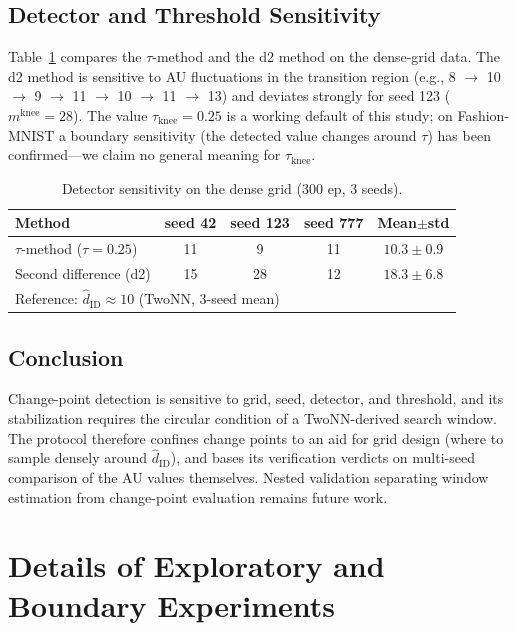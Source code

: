 \documentclass[make,article,submit,pdftex,moreauthors]{Definitions/mdpi}
\newcommand{\hatdID}{\hat{d}_{\mathrm{ID}}}
\newcommand{\mknee}{m^{\mathrm{knee}}}
\begin{document}
\subsection[\appendixname~\thesubsection]{Detector and Threshold Sensitivity}

Table~\ref{tab:knee_method} compares the $\tau$-method and the d2 method on
the dense-grid data.
The d2 method is sensitive to AU fluctuations in the transition region
(e.g., 8 $\to$ 10 $\to$ 9 $\to$ 11 $\to$ 10 $\to$ 11 $\to$ 13) and deviates
strongly for seed 123 ($\mknee = 28$).
The value $\tau_{\mathrm{knee}} = 0.25$ is a working default of this study;
on Fashion-MNIST a boundary sensitivity (the detected value changes around
$\tau$) has been confirmed---we claim no general meaning for
$\tau_{\mathrm{knee}}$.

\begin{table}[H]
\caption{Detector sensitivity on the dense grid (300 ep, 3 seeds).}
\label{tab:knee_method}
\small
\begin{tabular}{lcccc}
\toprule
\textbf{Method} & \textbf{seed 42} & \textbf{seed 123} & \textbf{seed 777} & \textbf{Mean$\pm$std} \\
\midrule
$\tau$-method ($\tau = 0.25$) & 11 & 9 & 11 & $10.3 \pm 0.9$ \\
Second difference (d2) & 15 & 28 & 12 & $18.3 \pm 6.8$ \\
\midrule
\multicolumn{5}{l}{Reference: $\hatdID \approx 10$ (TwoNN, 3-seed mean)} \\
\bottomrule
\end{tabular}
\end{table}

\subsection[\appendixname~\thesubsection]{Conclusion}

Change-point detection is sensitive to grid, seed, detector, and threshold,
and its stabilization requires the circular condition of a TwoNN-derived
search window.
The protocol therefore confines change points to an aid for grid design
(where to sample densely around $\hatdID$), and bases its verification
verdicts on multi-seed comparison of the AU values themselves.
Nested validation separating window estimation from change-point evaluation
remains future work.

\section[\appendixname~\thesection]{Details of Exploratory and Boundary Experiments}\label{app:exploratory}
\end{document}
